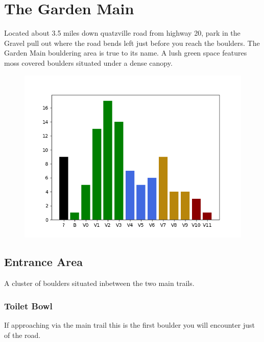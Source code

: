 \chapter{The Garden Main}\label{a:The Garden Main}
\lhead{\textcolor{\chapterColor}{\rule[-2pt]{\textwidth}{15pt}}}
Located about 3.5 miles down quatzville road from highway 20, park in the Gravel pull out where the road bends left just before you reach the boulders. The Garden Main bouldering area is true to its name. A lush green space features moss covered boulders situated under a dense canopy.
\begin{figure}[h]
  \centering
    \includegraphics[width=\linewidth]{./maps/plots/The Garden Main.png}
\end{figure}

\section{Entrance Area}\label{sa:Entrance Area}
A cluster of boulders situated inbetween the two main trails.
\subsection*{Toilet Bowl}\label{bf:Toilet Bowl}
If approaching via the main trail this is the first boulder you will encounter just of the road.

